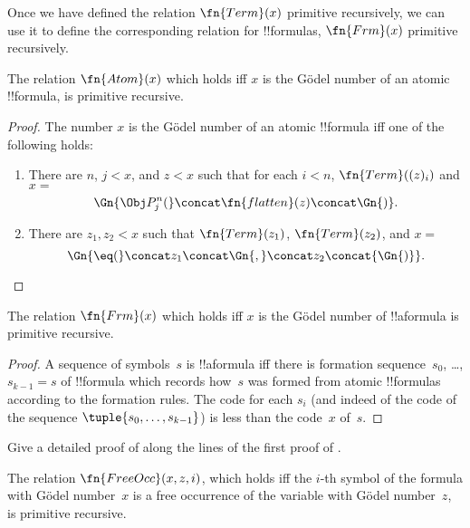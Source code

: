 \documentclass[../../../include/open-logic-section]{subfiles}
\begin{document}

Once we have defined the relation $\fn{Term}(x)$ primitive
recursively, we can use it to define the corresponding relation for
!!{formula}s, $\fn{Frm}(x)$ primitive recursively.

\begin{prop}
The relation $\fn{Atom}(x)$ which holds iff $x$ is the G\"odel number
of an atomic !!{formula}, is primitive recursive.
\end{prop}

\begin{proof}
The number $x$ is the G\"odel number of an atomic !!{formula} iff
one of the following holds:
\begin{enumerate}
\item There are $n$, $j < x$, and $z < x$ such that for each $i < n$,
  $\fn{Term}((z)_i)$ and $x = $
\[
\Gn{\Obj P^n_j(} \concat \fn{flatten}(z) \concat \Gn{)}.
\]
\item There are $z_1, z_2 < x$ such that $\fn{Term}(z_1)$,
  $\fn{Term}(z_2)$, and $x = $
\[
\Gn{{\eq}(} \concat z_1 \concat \Gn{,} \concat z_2 \concat{\Gn{)}}.
\]
\end{enumerate}
\end{proof}

\begin{prop}
The relation $\fn{Frm}(x)$ which holds iff $x$ is the G\"odel number
of !!a{formula} is primitive recursive.
\end{prop}

\begin{proof}
A sequence of symbols~$s$ is !!a{formula} iff there is formation
sequence~$s_0$, \dots, $s_{k-1} = s$ of !!{formula} which records
how~$s$ was formed from atomic !!{formula}s according to the
formation rules.  The code for each $s_i$ (and indeed of the code of
the sequence $\tuple{s_0, \dots, s_{k-1}}$) is less than the code~$x$
of~$s$.
\end{proof}

\begin{prob}
Give a detailed proof of  along
the lines of the first proof of
.
\end{prob}

\begin{prop}
The relation $\fn{FreeOcc}(x, z, i)$, which holds iff the $i$-th
symbol of the formula with G\"odel number~$x$ is a free occurrence of
the variable with G\"odel number~$z$, is primitive recursive.
\end{prop}
\end{document}
